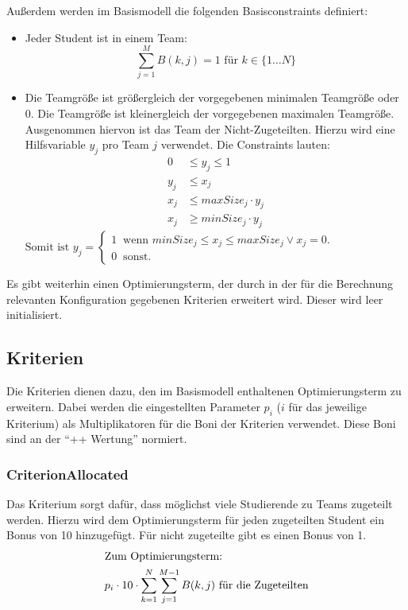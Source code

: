 \documentclass[parskip=full]{scrartcl}
\begin{document}
Außerdem werden im Basismodell die folgenden Basisconstraints definiert:



 \begin{itemize}
   \item Jeder Student ist in einem Team: \begin{equation*}
   \sum_{j = 1}^{M} B(k,j) = 1 \text{ für } k \in \{ 1\ldots N \}
   \end{equation*}
   \item Die Teamgröße ist größergleich der vorgegebenen minimalen Teamgröße
   oder 0. Die Teamgröße ist kleinergleich der vorgegebenen maximalen Teamgröße.
   Ausgenommen hiervon ist das Team der Nicht-Zugeteilten. Hierzu wird eine
   Hilfsvariable $y_j$ pro Team $j$ verwendet. Die Constraints lauten:
   \begin{align*}
    0 &\le  y_j \le 1\\
     y_j &\le x_j\\ 
    x_j &\le maxSize_j \cdot y_j \\ 
    x_j &\ge minSize_j \cdot y_j 
    \end{align*}
    $\text{Somit ist } y_j = \begin{cases}
    1 \;\; \text{wenn $minSize_j \le x_j \le maxSize_j \vee x_j = 0$.} \\
    0 \;\; \text{sonst.} 
    \end{cases}$
 \end{itemize}
 
 Es gibt weiterhin einen Optimierungsterm, der durch in der für die Berechnung
 relevanten Konfiguration gegebenen Kriterien erweitert wird. Dieser wird leer
 initialisiert.


\subsection{Kriterien}
Die Kriterien dienen dazu, den im Basismodell enthaltenen Optimierungsterm zu
erweitern. Dabei werden die eingestellten Parameter $p_i$ ($i$ für das
jeweilige Kriterium) als Multiplikatoren für die Boni der Kriterien verwendet.
Diese Boni sind an der \enquote{++ Wertung} normiert. 

\subsubsection{CriterionAllocated}
Das Kriterium sorgt dafür, dass möglichst viele Studierende zu Teams zugeteilt
werden. Hierzu wird dem Optimierungsterm für jeden zugeteilten Student ein Bonus
von 10 hinzugefügt. Für nicht zugeteilte gibt es einen Bonus von 1. \begin{align*}
\intertext{Zum Optimierungsterm:}
p_i \cdot 10 \cdot \sum_{k = 1}^{N} \sum_{j = 1}^{M-1} B(k,j) \text{ für die
Zugeteilten}
\end{align*}
\end{document}
